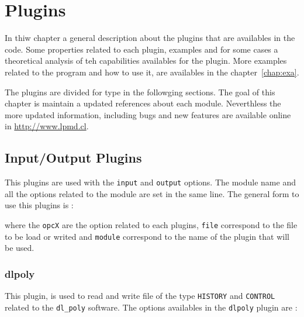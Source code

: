 \chapter{Plugins}
\label{chap:modulos}

In thiw chapter a general description about the plugins that are availables in
the {\lpmd} code. Some properties related to each plugin, examples and for some
cases a theoretical analysis of teh capabilities availables for the plugin.
More examples related to the program {\lpmd} and how to use it, are availables
in the chapter~\ref{chap:exa}.

The plugins are divided for type in the followging sections. The goal of this
chapter is maintain a updated references about each module. Neverthless the
more updated information, including bugs and new features are available online
in \url{http://www.lpmd.cl}.

\section{Input/Output Plugins}
\label{chap:modulos:entradasalida}

This plugins are used with the \verb|input| and \verb|output| options. The
module name and all the options related to the module are set in the same line.
The general form to use this plugins is :


\noindent
where the \verb|opcX| are the option related to each plugins, \verb|file|
correspond to the file to be load or writed and \verb|module| correspond to the
name of the plugin that will be used.

\subsection{dlpoly}

This plugin, is used to read and write file of the type \verb|HISTORY| and
\verb|CONTROL| related to the \verb|dl_poly| software. The options availables
in the \verb|dlpoly| plugin are :



